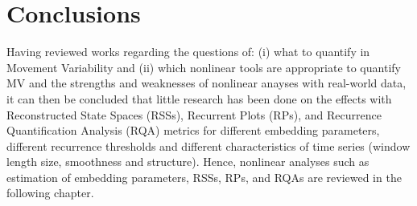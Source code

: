 %


\section{Conclusions}
Having reviewed works regarding the questions of: (i) what to quantify in 
Movement Variability and (ii) which nonlinear tools are appropriate to quantify 
MV and the strengths and weaknesses of nonlinear anayses with 
real-world data, it can then be concluded that little research has been done 
on the effects with Reconstructed State Spaces (RSSs), Recurrent Plots (RPs), 
and Recurrence Quantification Analysis (RQA) metrics for different 
embedding parameters, different recurrence thresholds and different 
characteristics of time series (window length size, smoothness and structure).
Hence, nonlinear analyses such as estimation of embedding parameters, 
RSSs, RPs, and RQAs are reviewed in the following chapter.





